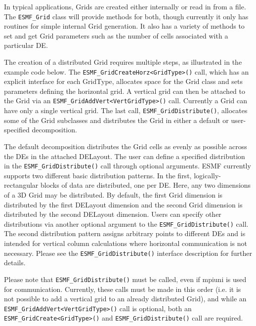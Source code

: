 


In typical applications, Grids are created either internally or read in from
a file.  The {\tt ESMF\_Grid} class will provide methods for both, though 
currently it only has routines for simple internal Grid generation.  It also
has a variety of methods to set and get Grid parameters such as the number of
cells associated with a particular DE.  

The creation of a distributed Grid requires multiple steps, as
illustrated in the example code below.  The {\tt ESMF\_GridCreateHorz<GridType>()}
call, which has an explicit interface for each GridType, allocates space for the
Grid class and sets parameters defining the horizontal grid.  A vertical grid
can then be attached to the Grid via an {\tt ESMF\_GridAddVert<VertGridType>()}
call.  Currently a Grid can have only a single vertical grid.  The last call,
{\tt ESMF\_GridDistribute()}, allocates some of the Grid subclasses and
distributes the Grid in either a default or user-specified decomposition.

The default decomposition distributes the Grid cells as evenly as possible across
the DEs in the attached DELayout.  The user can define a specified distribution
in the {\tt ESMF\_GridDistribute()} call through optional arguments.  ESMF
currently supports two different basic distribution patterns.  In the first,
logically-rectangular blocks of data are distributed, one per DE.  Here, any two
dimensions of a 3D Grid may be distributed.  By default, the first Grid
dimension is distributed by the first DELayout dimension and the second Grid
dimension is distributed by the second DELayout dimension.  Users can specify
other distributions via another optional argument to the {\tt ESMF\_GridDistribute()}
call.  The second distribution pattern assigns arbitrary points to different DEs
and is intended for vertical column calculations where horizontal communication
is not necessary.  Please see the {\tt ESMF\_GridDistribute()} interface
description for further details.

Please note that {\tt ESMF\_GridDistribute()} must be called, even if mpiuni is
used for communication.  Currently, these calls must be made in this order
(i.e. it is not possible to add a vertical grid to an already distributed
Grid), and while an {\tt ESMF\_GridAddVert<VertGridType>()} call is optional,
both an {\tt ESMF\_GridCreate<GridType>()} and {\tt ESMF\_GridDistribute()}
call are required.

